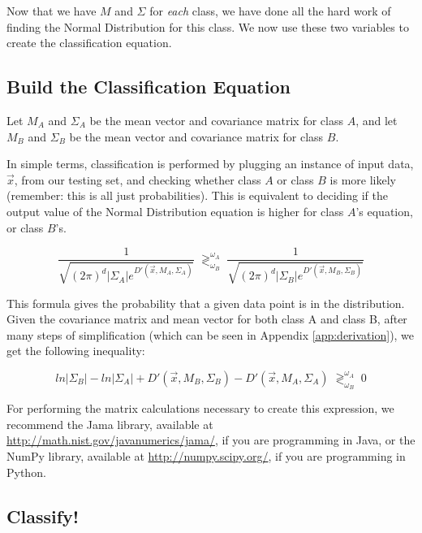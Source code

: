 \documentclass{article}
\begin{document}
Now that we have $M$ and $\Sigma$ for \emph{each} class, we have done
all the hard work of finding the Normal Distribution for this class.
We now use these two variables to create the classification equation.

\subsection{Build the Classification Equation}

Let $M_A$ and $\Sigma_A$ be the mean vector and covariance matrix for
class $A$, and let $M_B$ and $\Sigma_B$ be the mean vector and
covariance matrix for class $B$.

In simple terms, classification is performed by plugging an
instance of input data, $\vec{x}$, from our testing set, and
checking whether class $A$ or class $B$ is more likely (remember: this is all
just probabilities). This is equivalent to deciding if the output value of the Normal
Distribution equation is higher for class $A$'s equation, or class $B$'s.

\begin{equation}
\label{e_ce}
  \dfrac{1}{\sqrt{(2\pi)^d |\Sigma_A| e^{D'(\vec{x},M_A,\Sigma_A)}}} 
  \; \gtrless^{\omega_A}_{\omega_B} \; 
  \dfrac{1}{\sqrt{(2\pi)^d |\Sigma_B| e^{D'(\vec{x},M_B,\Sigma_B)}}}
\end{equation}

This formula gives the probability that a given data point is in the
distribution.  Given the covariance matrix and mean vector for both
class A and class B, after many steps of simplification (which can be
seen in Appendix \ref{app:derivation}), we get the following
inequality:

\begin{equation}
\label{e_ce2}
ln|\Sigma_B| - ln|\Sigma_A| + D'(\vec{x},M_B,\Sigma_B) - D'(\vec{x},M_A,\Sigma_A)
\; \gtrless^{\omega_A}_{\omega_B} \; 0 
\end{equation}

For performing the matrix calculations necessary to create this expression, we
recommend the Jama library, available at
\href{http://math.nist.gov/javanumerics/jama/}{http://math.nist.gov/javanumerics/jama/},
if you are programming in Java, or the NumPy library,
available at \href{http://numpy.scipy.org/}{http://numpy.scipy.org/}, if you are
programming in Python.

\subsection{Classify!}
\end{document}
